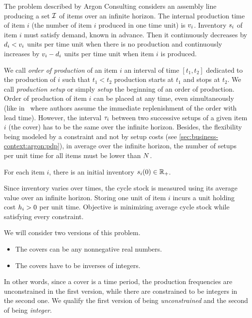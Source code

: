 The problem described by Argon Consulting considers an assembly line producing a set $\mathcal{I}$ of items over an infinite horizon.
The internal production time of item $i$ (\ie the number of item $i$ produced in one time unit) is $v_i$.
Inventory $s_i$ of item $i$ must satisfy demand, known in advance.
Then it continuously decreases by $d_i<v_i$ units per time unit when there is no production and continuously increases by $v_i-d_i$ units per time unit when item $i$ is produced.


We call \emph{order of production} of an item $i$ an interval of time $[t_1,t_2]$ dedicated to the production of $i$ such that $t_1<t_2$ production starts at $t_1$ and stops at $t_2$.
We call \emph{production setup} or simply \emph{setup} the beginning of an order of production.
Order of production of item $i$ can be placed at any time, even simultaneously (like in~\cite{Ohno2001} where authors assume the immediate replenishment of the order with lead time).
However, the interval $\tau_i$ between two successive setups of a given item $i$ (\ie the cover) has to be the same over the infinite horizon.
Besides, the flexibility being modeled by a constraint and not by setup costs (see \cref{sec:business-context:argon:pdp}), in average over the infinite horizon, the number of setups per unit time for all items must be lower than $N$.


For each item $i$, there is an initial inventory $s_i\bracket{0}\in\RR_+$.


Since inventory varies over times, the cycle stock is measured using its average value over an infinite horizon.
Storing one unit of item $i$ incurs a unit holding cost $h_i>0$ per unit time.
Objective is minimizing average cycle stock while satisfying every constraint.


\medskip


We will consider two versions of this problem.
\begin{itemize}
  \item The covers can be any nonnegative real numbers.
  \item The covers have to be inverses of integers.
\end{itemize}
In other words, since a cover is a time period, the production frequencies are unconstrained in the first version, while there are constrained to be integers in the second one. We qualify the first version of being {\em unconstrained} and the second of being {\em integer}.




